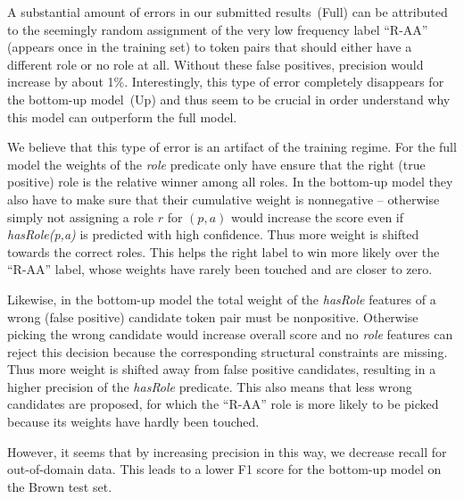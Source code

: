 


A substantial amount of errors in our submitted results~(Full) can be attributed to the seemingly random assignment of the very low frequency label ``R-AA'' (appears once in the training set) to token pairs that should either have a different role or no role at all. Without these false positives, precision would increase by about 1\%. Interestingly, this type of error completely disappears for the bottom-up model~(Up) and thus seem to be crucial in order understand why this model can outperform the full model. 

We believe that this type of error is an artifact of the training regime. For the full model the weights of the \emph{role} predicate only have ensure that the right (true positive) role is the relative winner among all roles. In the bottom-up model they also have to make sure that their cumulative weight is nonnegative -- otherwise simply not assigning a role $r$ for $(p,a)$ would increase the score even if \emph{hasRole(p,a)} is predicted with high confidence. Thus more weight is shifted towards the correct roles. This helps the right label to win more likely over the ``R-AA'' label, whose weights have rarely been touched and are closer to zero.

Likewise, in the bottom-up model the total weight of the \emph{hasRole} features of a wrong (false positive) candidate token pair must be nonpositive. Otherwise picking the wrong candidate would increase overall score and no \emph{role} features can reject this decision because the corresponding structural constraints are missing. Thus more weight is shifted away from false positive candidates, resulting in a higher precision of the \emph{hasRole} predicate. This also means that less wrong candidates are proposed, for which the ``R-AA'' role is more likely to be picked because its weights have hardly been touched.

However, it seems that by increasing precision in this way, we decrease recall for out-of-domain data. This leads to a lower F1 score for the bottom-up model on the Brown test set.


